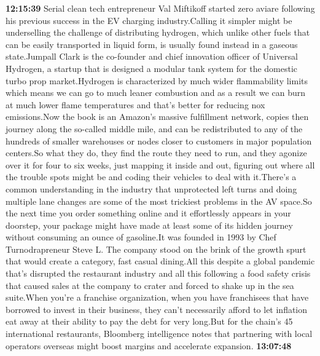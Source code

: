\documentclass{article}%
\begin{document}
\textbf{12:15:39}%
Serial clean tech entrepreneur Val Miftikoff started zero aviare following his previous success in the EV charging industry.Calling it simpler might be underselling the challenge of distributing hydrogen, which unlike other fuels that can be easily transported in liquid form, is usually found instead in a gaseous state.Jumpall Clark is the co{-}founder and chief innovation officer of Universal Hydrogen, a startup that is designed a modular tank system for the domestic turbo prop market.Hydrogen is characterized by much wider flammability limits which means we can go to much leaner combustion and as a result we can burn at much lower flame temperatures and that's better for reducing nox emissions.Now the book is an Amazon's massive fulfillment network, copies then journey along the so{-}called middle mile, and can be redistributed to any of the hundreds of smaller warehouses or nodes closer to customers in major population centers.So what they do, they find the route they need to run, and they agonize over it for four to six weeks, just mapping it inside and out, figuring out where all the trouble spots might be and coding their vehicles to deal with it.There's a common understanding in the industry that unprotected left turns and doing multiple lane changes are some of the most trickiest problems in the AV space.So the next time you order something online and it effortlessly appears in your doorstep, your package might have made at least some of its hidden journey without consuming an ounce of gasoline.It was founded in 1993 by Chef Turnodrapreneur Steve L. The company stood on the brink of the growth spurt that would create a category, fast casual dining.All this despite a global pandemic that's disrupted the restaurant industry and all this following a food safety crisis that caused sales at the company to crater and forced to shake up in the sea suite.When you're a franchise organization, when you have franchisees that have borrowed to invest in their business, they can't necessarily afford to let inflation eat away at their ability to pay the debt for very long.But for the chain's 45 international restaurants, Bloomberg intelligence notes that partnering with local operators overseas might boost margins and accelerate expansion.%
\textbf{13:07:48}%
\end{document}
